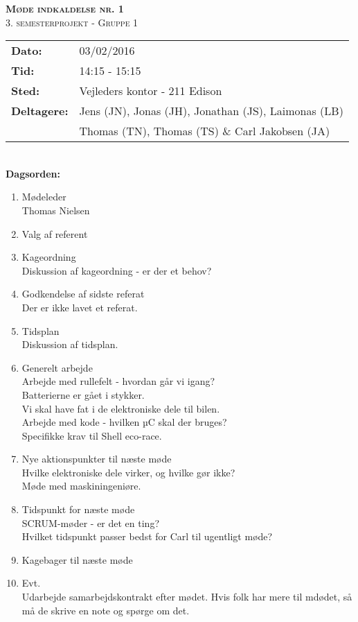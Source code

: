 
\newcommand{\HRule}{\rule{\linewidth}{0.1mm}}


	\begin{center}
		{\huge \bfseries \textsc{Møde indkaldelse nr. 1}}\\
		\textsc{\large 3. semesterprojekt - Gruppe 1}\\[0.3cm]
	\end{center}
	\begin{tabular}{ll}
	\large \textbf{Dato:} & 03/02/2016  \\ %
	\large \textbf{Tid:}  & 14:15 - 15:15 \\ %
	\large \textbf{Sted:} & Vejleders kontor - 211 Edison		\\ %
	\large \textbf{Deltagere:} & Jens (JN), Jonas (JH), Jonathan (JS), Laimonas (LB) \\
	\large \textbf & Thomas (TN),  Thomas (TS) \& Carl Jakobsen (JA)\\
	\end{tabular}\\
	\phantom{\,}\hspace{0.1em} \large \textbf{Dagsorden:}
	\begin{enumerate}
		\itemsep 0.3em 
		\item Mødeleder\\
			Thomas Nielsen
		\item Valg af referent
		\item Kageordning\\
			Diskussion af kageordning - er der et behov?
		\item Godkendelse af sidste referat\\
			Der er ikke lavet et referat.
		\item Tidsplan\\
			Diskussion af tidsplan.
		\item Generelt arbejde\\
			Arbejde med rullefelt - hvordan går vi igang?\\
			Batterierne er gået i stykker.\\
			Vi skal have fat i de elektroniske dele til bilen.\\
			Arbejde med kode - hvilken µC skal der bruges?\\
			Specifikke krav til Shell eco-race.
		\item Nye aktionspunkter til næste møde\\
			Hvilke elektroniske dele virker, og hvilke gør ikke?\\
			Møde med maskiningeniøre.
		\item Tidspunkt for næste møde\\
			SCRUM-møder - er det en ting?\\
			Hvilket tidspunkt passer bedst for Carl til ugentligt møde?
		\item Kagebager til næste møde
		\item Evt.\\
			Udarbejde samarbejdskontrakt efter mødet.
			Hvis folk har  mere til mdødet, så må de skrive en note og spørge om det.\\
	\end{enumerate}
